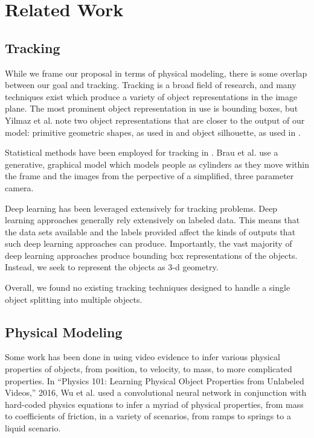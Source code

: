 \documentclass[runningheads]{llncs}
\begin{document}
\section{Related Work}

\subsection{Tracking}

While we frame our proposal in terms of physical modeling, there is some overlap 
between our goal and tracking. Tracking is a broad field of research, and many 
techniques exist which produce a variety of object representations in the image 
plane. The most prominent object representation in use is bounding boxes, but Yilmaz 
et al.\cite{Yilmaz:2006:OTS:1177352.1177355} note two object representations that are closer to the 
output of our model: primitive geometric shapes, as used in \cite{Comaniciu2003} and object silhouette, 
as used in \cite{YILMAZ2003623}.


Statistical methods have been employed for tracking in \cite{4767755} \cite{BarShalom1990} \cite{317728} \cite{Brau_2013_ICCV}.
Brau et al.\cite{Brau_2013_ICCV} use a generative, graphical model which models people as cylinders 
as they move within the frame and the images from the perpective of a 
simplified, three parameter camera.

Deep learning has been leveraged extensively for tracking problems.\cite{LI2018323} 
Deep learning approaches generally rely extensively on labeled data. This means that the data sets 
available and the labels provided affect the kinds of outputs that such deep 
learning approaches can produce. Importantly, the vast majority of deep learning 
approaches produce bounding box representations of the objects. Instead, we seek 
to represent the objects as 3-d geometry.

Overall, we found no existing tracking techniques designed to handle a single 
object splitting into multiple objects.

\subsection{Physical Modeling}

Some work has been done in using video evidence to infer various physical 
properties of objects, from position, to velocity, to mass, to more complicated 
properties. In “Physics 101: Learning Physical Object Properties from Unlabeled 
Videos,” 2016, Wu et al. used a convolutional neural network in conjunction with 
hard-coded physics equations to infer a myriad of physical properties, from mass 
to coefficients of friction, in a variety of scenarios, from ramps to springs to 
a liquid scenario.
\end{document}
